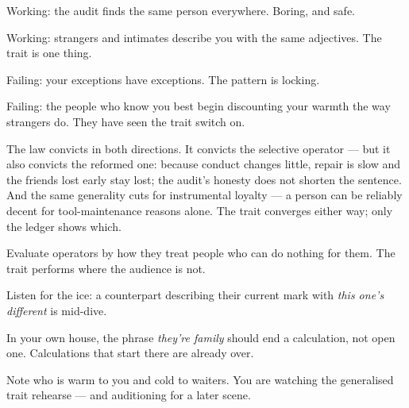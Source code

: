 \begin{feedback}
  \item Working: the audit finds the same person everywhere. Boring, and safe.
  \item Working: strangers and intimates describe you with the same adjectives. The trait is one thing.
  \item Failing: your exceptions have exceptions. The pattern is locking.
  \item Failing: the people who know you best begin discounting your warmth the way strangers do. They have seen the trait switch on.
\end{feedback}
\begin{failure}
The law convicts in both directions. It convicts the selective operator --- but it also convicts the reformed one: because conduct changes little, repair is slow and the friends lost early stay lost; the audit's honesty does not shorten the sentence. And the same generality cuts for instrumental loyalty --- a person can be reliably decent for tool-maintenance reasons alone. The trait converges either way; only the ledger shows which.
\end{failure}
\begin{countermeasures}
  \item Evaluate operators by how they treat people who can do nothing for them. The trait performs where the audience is not.
  \item Listen for the ice: a counterpart describing their current mark with \emph{this one's different} is mid-dive.
  \item In your own house, the phrase \emph{they're family} should end a calculation, not open one. Calculations that start there are already over.
  \item Note who is warm to you and cold to waiters. You are watching the generalised trait rehearse --- and auditioning for a later scene.
\end{countermeasures}

\seesources
{}
